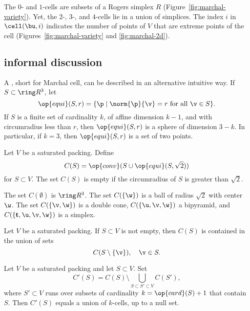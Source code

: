 \begin{cnl}
\figKVIVUOT %

The $0$- and $1$-cells are subsets of a Rogers simplex $R$
(Figure~\ref{fig:marchal-variety}).  Yet, the $2$-, $3$-, and
$4$-cells lie in a union of simplices.  The index $i$ in
$\cell(\bu,i)$ indicates the number of points of $V$ that are extreme
points of the cell (Figures~\ref{fig:marchal-variety} and
\ref{fig:marchal-2d}).

\figBWEYURN %

\subsection{informal discussion}\label{informal}

A , short for Marchal cell,
can be described in an alternative intuitive way.
If $S\subset\vecR{3}$, let
\[
\op{equi}(S,r) = \setcomp{ \p }{ \norm{\p}{\v} = r \text{ for all } \v \in S }.
\]
If $S$ is a finite set of cardinality $k$, of affine dimension $k-1$, and
with circumradius less than $r$, then
$\op{equi}(S,r)$ is a sphere of dimension $3-k$.  In particular,
if $k=3$, then $\op{equi}(S,r)$ is a set of two points.
%
%

Let $V$ be a saturated packing.  Define
\[
C(S) = \op{conv} (S\cup\op{equi}(S, \sqrt2) )
\]
for $S\subset V$.  The set $C(S)$ is empty if the circumradius of $S$
is greater than $\sqrt2$.

The set $C(\emptyset)$ is $\vecR{3}$.  The set $C(\braced{\w})$ is a ball
of radius $\sqrt2$ with center $\w$.  The set $C(\braced{\v,\w})$ is a
double cone, $C(\braced{\u,\v,\w})$ a bipyramid, and $C(\{{\mathbf
  t},\u,\v,\w\})$ is a simplex.

\begin{lemma}
\label{lemma:CS-union}
%
Let $V$ be a saturated packing.  If $S\subset V$ is not empty, then
$C(S)$ is contained in the union of sets
\[
C(S\setminus \braced{\v}),  \quad \v\in S.
\]
\end{lemma}

\begin{lemma}
%
Let $V$ be a saturated packing and let $S\subset V$. 
Set
\[C'(S) = C(S) \setminus \bigcup_{S\subset S'\subset V} C(S'),\] where
$S'\subset V$ runs over subsets of cardinality $k=\op{card}(S)+1$ that
contain $S$.  Then $C'(S)$ equals a union of $k$-cells,
up to a null set.
\end{lemma}


\end{cnl}
